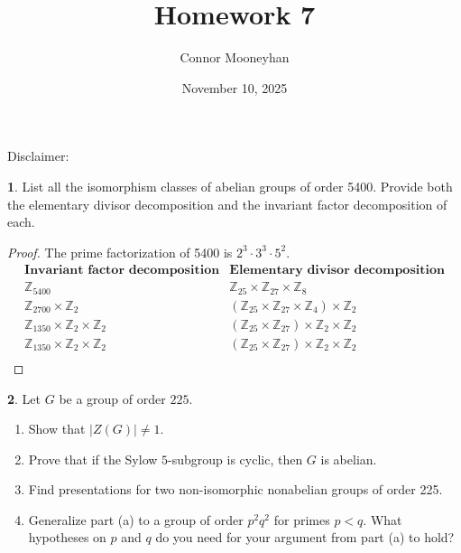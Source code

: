 \documentclass[12pt]{article}
\title{Homework 7}
\author{Connor Mooneyhan}
\date{November 10, 2025}
\newcommand{\Z}{\mathbb{Z}}
\theoremstyle{definition}
\newtheorem{ex}{}
\begin{document}
\maketitle

Disclaimer:

\begin{ex}
	List all the isomorphism classes of abelian groups of order 5400.  Provide both
	the elementary divisor decomposition and the invariant factor decomposition of each.
\end{ex}
\begin{proof}
	The prime factorization of 5400 is $2^3 \cdot 3^3 \cdot 5^2$.
	\begin{equation*}
		\begin{array}{c|c}
			\textbf{Invariant factor decomposition} & \textbf{Elementary divisor decomposition}          \\
			\hline
			\Z_{5400}                               & \Z_{25} \times \Z_{27} \times \Z_{8}               \\
			\Z_{2700} \times \Z_2                   & (\Z_{25} \times \Z_{27} \times \Z_{4}) \times \Z_2 \\
      \Z_{1350} \times \Z_2 \times \Z_2                   & (\Z_{25} \times \Z_{27}) \times \Z_2 \times \Z_2 \\
      \Z_{1350} \times \Z_2 \times \Z_2                   & (\Z_{25} \times \Z_{27}) \times \Z_2 \times \Z_2 \\
		\end{array}
	\end{equation*}
\end{proof}

\begin{ex}
	Let $G$ be a group of order $225$.
	\begin{enumerate}
		\item Show that $|Z(G)| \neq 1$.
		\item Prove that if the Sylow $5$-subgroup is cyclic, then $G$ is abelian.
		\item Find presentations for two non-isomorphic nonabelian groups of order 225.
		\item Generalize part (a) to a group of order $p^2q^2$ for primes $p < q$.
		      What hypotheses on $p$ and $q$ do you need for your argument from part (a) to hold?
	\end{enumerate}
\end{ex}
\end{document}
